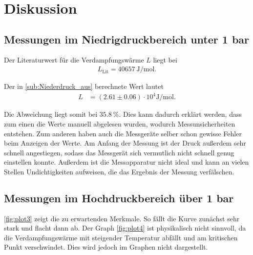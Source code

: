 \section{Diskussion}
\label{sec:Diskussion}

\subsection{Messungen im Niedrigdruckbereich unter 1 bar}
Der Literaturwert für die Verdampfungswärme $L$ liegt bei 
\begin{align*}
    L_{\text{Lit}}=\qty{40657}{\joule\per\mol}.
\end{align*}\cite{Verdampfungswärme}

Der in \autoref{sub:Niederdruck_aus} berechnete Wert lautet
\begin{align*}
    L &= (2.61\pm 0.06)\cdot 10^4 \si{\joule\per\mol}.
\end{align*} 

Die Abweichung liegt somit bei $\qty{35.8}{\percent}$.
Dies kann dadurch erklärt werden, dass zum einen die Werte manuell abgelesen wurden, wodurch Messunsicherheiten entstehen.
Zum anderen haben auch die Messgeräte selber schon gewisse Fehler beim Anzeigen der Werte. Am Anfang der Messung ist der Druck außerdem sehr schnell angestiegen,
sodass das Messgerät sich vermutlich nicht schnell genug einstellen konnte. 
Außerdem ist die Messapparatur nicht ideal und kann an vielen Stellen Undichtigkeiten aufweisen, die das Ergebnis der Messung verfälschen.

\subsection{Messungen im Hochdruckbereich über 1 bar}
\autoref{fig:plot3} zeigt die zu erwartenden Merkmale. So fällt die Kurve zunächst sehr stark und flacht dann ab.
Der Graph \ref{fig:plot4} ist physikalisch nicht sinnvoll, da die Verdampfungswärme mit steigender Temperatur abfällt und am kritischen Punkt verschwindet.
Dies wird jedoch im Graphen nicht dargestellt.

\pagebreak